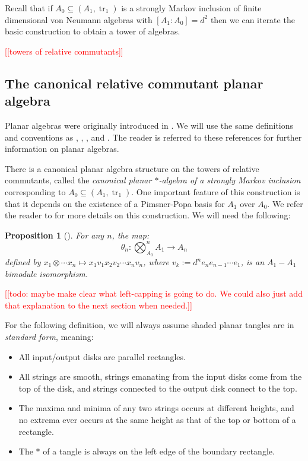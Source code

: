 \documentclass[11pt]{article}
\theoremstyle{plain}
\newtheorem{prop}[thm]{Proposition}
\theoremstyle{definition}
\DeclareMathOperator{\tr}{tr}
\newcommand{\nn}[1]{\textcolor{red}{[[#1]]}}
\begin{document}
Recall that if $A_0\subseteq (A_1,\tr_1)$ is a strongly Markov inclusion of finite dimensional von Neumann algebras with $[A_1:A_0]=d^2$ then we can iterate the basic construction to obtain a tower of algebras.

\nn{towers of relative commutants}



\subsection{The canonical relative commutant planar algebra}%
\label{sec:StronglyMarkovPA}
\label{ssec:canonical}

Planar algebras were originally introduced in \cite{math.QA/9909027}. We will use the same definitions and conventions as \cite{MR2812459}, \cite{MR2679382}, \cite{jones}, and \cite{MR2972458}. The reader is referred to these references for further information on planar algebras. 

There is a canonical planar algebra structure on the towers of relative commutants, called the \textit{canonical planar $\ast$-algebra of a strongly Markov inclusion} corresponding to $A_0\subseteq (A_1,\tr_1)$. One important feature of this construction is that it depends on the existence of a Pimsner-Popa basis for $A_1$ over $A_0$. 
We refer the reader to \cite{MR2812459} for more details on this construction. 
We will need the following:
\begin{prop}[{\cite[Prop 2.25]{MR2812459}}]\label{iso}
For any $n$, the map:
\[
\theta_n: \bigotimes_{A_0}^{n}A_1 \rightarrow A_n
\]
defined by $x_1\otimes\cdots x_n \mapsto x_1v_1x_2v_2\cdots x_nv_n$, where $v_k:=d^ne_ne_{n-1}\cdots e_1$, is an $A_1-A_1$ bimodule isomorphism.
\end{prop}


\nn{todo: maybe make clear what left-capping is going to do. We could also just add that explanation to the next section when needed.}


For the following definition, we will always assume shaded planar tangles are in \textit{standard form}, meaning:
\begin{itemize}
\item All input/output disks are parallel rectangles.
\item All strings are smooth, strings emanating from the input disks come from the top of the disk, and strings connected to the output disk connect to the top.
\item The maxima and minima of any two strings occurs at different heights, and no extrema ever occurs at the same height as that of the top or bottom of a rectangle.
\item The $\ast$ of a tangle is always on the left edge of the boundary rectangle.
\end{itemize}
\end{document}
